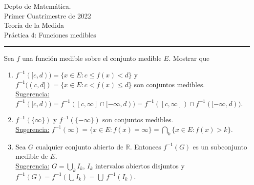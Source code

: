 \documentclass{book}
\newcommand{\rr}{\mathbb{R}}
\begin{document}


\begin{large}
\begin{bfseries} %
        \noindent Depto de Matem\'atica.\\
        Primer Cuatrimestre de 2022\\                                                                                                                                                                                                                                                                                                                                                
        Teoría de la Medida \\
        Práctica 4: Funciones medibles

\end{bfseries}
\end{large}
\par\noindent\rule{\textwidth}{.5pt}

	\begin{ejer}{} 
Sea $f$ una  funci\'on medible sobre el conjunto medible $E$. Mostrar que
\begin{enumerate}
\item $f^{-1}([c,d))=\{ x \in E: c\leq f(x)<d \}$ y 
$f^{-1}((c,d])=\{ x \in E: c< f(x)\leq d \}$ son conjuntos medibles.
\\
\underline{Sugerencia:} $f^{-1}([c,d))=f^{-1}([c,\infty]\cap [-\infty,d))=f^{-1}([c,\infty])\cap f^{-1}( [-\infty,d)).$
\item  $f^{-1}(\{\infty\})$ y $f^{-1}(\{-\infty\})$ son conjuntos  medibles.
\\
\underline{Sugerencia:} $f^{-1}({\infty})=\{ x \in E: f(x)=\infty \}=  \bigcap\limits_k \{ x \in E: f(x)>k\}.$ 
\item Sea $G$ cualquier conjunto abierto de $\rr$. Entonces $f^{-1}(G)$ es un subconjunto medible de $E$.
\\
\underline{Sugerencia:} $G=\bigcup\limits_k I_k$, $I_k$ intervalos abiertos disjuntos y 
$f^{-1}(G)=f^{-1}(\bigcup I_k)=\bigcup\ f^{-1}(I_k)$.
\end{enumerate}
\end{ejer}
\end{document}
